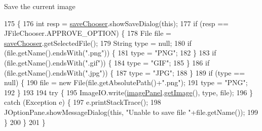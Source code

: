 Save the current image 
\begin{DoxyCode}
175                        \{
176         \textcolor{keywordtype}{int} resp = \mbox{\hyperlink{classorg_1_1newdawn_1_1slick_1_1tools_1_1scalar_1_1_scalar_aaba5299d75aaf1c811ea0a7395ef2afb}{saveChooser}}.showSaveDialog(\textcolor{keyword}{this});
177         \textcolor{keywordflow}{if} (resp == JFileChooser.APPROVE\_OPTION) \{
178             File file = \mbox{\hyperlink{classorg_1_1newdawn_1_1slick_1_1tools_1_1scalar_1_1_scalar_aaba5299d75aaf1c811ea0a7395ef2afb}{saveChooser}}.getSelectedFile();
179             String type = null;
180             \textcolor{keywordflow}{if} (file.getName().endsWith(\textcolor{stringliteral}{".png"})) \{
181                 type = \textcolor{stringliteral}{"PNG"};
182             \}
183             \textcolor{keywordflow}{if} (file.getName().endsWith(\textcolor{stringliteral}{".gif"})) \{
184                 type = \textcolor{stringliteral}{"GIF"};
185             \}
186             \textcolor{keywordflow}{if} (file.getName().endsWith(\textcolor{stringliteral}{".jpg"})) \{
187                 type = \textcolor{stringliteral}{"JPG"};
188             \}
189             \textcolor{keywordflow}{if} (type == null) \{
190                 file = \textcolor{keyword}{new} File(file.getAbsolutePath()+\textcolor{stringliteral}{".png"});
191                 type = \textcolor{stringliteral}{"PNG"};
192             \}
193             
194             \textcolor{keywordflow}{try} \{
195                 ImageIO.write(\mbox{\hyperlink{classorg_1_1newdawn_1_1slick_1_1tools_1_1scalar_1_1_scalar_a660c23cbae7b52f06768db8e8841bc39}{imagePanel}}.\mbox{\hyperlink{classorg_1_1newdawn_1_1slick_1_1tools_1_1scalar_1_1_image_panel_af4f896a1413288f465a7651d4c562c3c}{getImage}}(), type, file);
196             \} \textcolor{keywordflow}{catch} (Exception e) \{
197                 e.printStackTrace();
198                 JOptionPane.showMessageDialog(\textcolor{keyword}{this}, \textcolor{stringliteral}{"Unable to save file "}+file.getName());
199             \}
200         \}
201     \}
\end{DoxyCode}
\mbox{\label{classorg_1_1newdawn_1_1slick_1_1tools_1_1scalar_1_1_scalar_af7a11c387283a843d0991eeb7f9f7b17}} 
